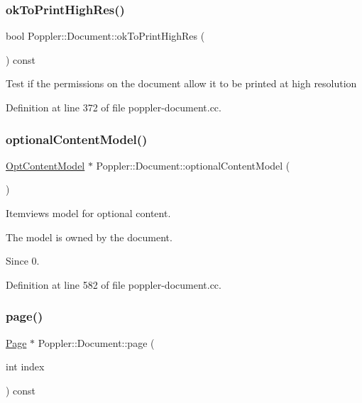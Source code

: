 \subsubsection{\texorpdfstring{ok\+To\+Print\+High\+Res()}{okToPrintHighRes()}}
{\footnotesize\ttfamily bool Poppler\+::\+Document\+::ok\+To\+Print\+High\+Res (\begin{DoxyParamCaption}{ }\end{DoxyParamCaption}) const}

Test if the permissions on the document allow it to be printed at high resolution 

Definition at line 372 of file poppler-\/document.\+cc.

\mbox{\label{class_poppler_1_1_document_aac1edcc34ce0b1bb00aaa3f372157a41}} 
\subsubsection{\texorpdfstring{optional\+Content\+Model()}{optionalContentModel()}}
{\footnotesize\ttfamily \hyperlink{class_poppler_1_1_opt_content_model}{Opt\+Content\+Model} $\ast$ Poppler\+::\+Document\+::optional\+Content\+Model (\begin{DoxyParamCaption}{ }\end{DoxyParamCaption})}

Itemviews model for optional content.

The model is owned by the document.

\begin{DoxySince}{Since}
0. 
\end{DoxySince}


Definition at line 582 of file poppler-\/document.\+cc.

\mbox{\label{class_poppler_1_1_document_ae4535b0dc763d6be42d775fa5d40c93a}} 
\subsubsection{\texorpdfstring{page()}{page()}\hspace{0.1cm}{\footnotesize\ttfamily [1/2]}}
{\footnotesize\ttfamily \hyperlink{class_poppler_1_1_page}{Page} $\ast$ Poppler\+::\+Document\+::page (\begin{DoxyParamCaption}\item[{int}]{index }\end{DoxyParamCaption}) const}

